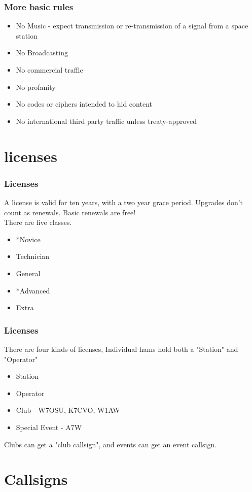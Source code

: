 \documentclass[10pt]{beamer}
\begin{document}
\begin{frame}
\frametitle{More basic rules}
\begin{itemize}
\item No Music - expect transmission or re-transmission of a signal from a space station
\item No Broadcasting
\item No commercial traffic
\item No profanity
\item No codes or ciphers intended to hid content
\item No international third party traffic unless treaty-approved
\end{itemize}
\end{frame}

\section{licenses}

\begin{frame}
\frametitle{Licenses}
A license is valid for ten years, with a two year grace period. Upgrades don't count as renewals. Basic renewals are free!\\
There are five classes.
\begin{itemize}
\item *Novice
\item Technician
\item General
\item *Advanced
\item Extra
\end{itemize}
\end{frame}

\begin{frame}
\frametitle{Licenses}
There are four kinds of licenses, Individual hams hold both a "Station" and "Operator"
\begin{itemize}
\item Station
\item Operator
\item Club - W7OSU, K7CVO, W1AW
\item Special Event - A7W
\end{itemize}
Clubs can get a "club callsign", and events can get an event callsign.
\end{frame}

\section{Callsigns}
\end{document}
